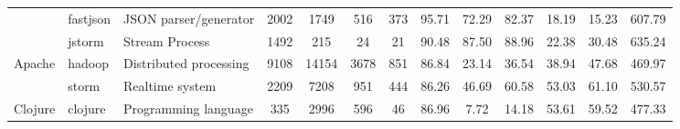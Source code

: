 \begin{table*}[]
{\begin{tabular}{lllcccccccccc}
                            & fastjson                                                      & JSON parser/generator                                                    & 2002           & 1749            & 516                                                              & 373            & 95.71          & 72.29          & 82.37          & 18.19                                                             & 15.23                                                              & 607.79                                               \\
                            & jstorm                                                        & Stream Process                                                           & 1492           & 215             & 24                                                               & 21             & 90.48          & 87.50          & 88.96          & 22.38                                                             & 30.48                                                              & 635.24                                               \\ \hline
\multirow{2}{*}{Apache}     & hadoop                                                        & Distributed processing                                                   & 9108           & 14154           & 3678                                                             & 851            & 86.84          & 23.14          & 36.54          & 38.94                                                             & 47.68                                                              & 469.97                                               \\
                            & storm                                                         & Realtime system                                                          & 2209           & 7208            & 951                                                              & 444            & 86.26          & 46.69          & 60.58          & 53.03                                                             & 61.10                                                              & 530.57                                               \\ \hline
Clojure                     & clojure                                                       & Programming language                                                     & 335            & 2996            & 596                                                              & 46             & 86.96          & 7.72           & 14.18          & 53.61                                                             & 59.52                                                              & 477.33                                               \\ \hline

\end{tabular}}
\end{table*}
